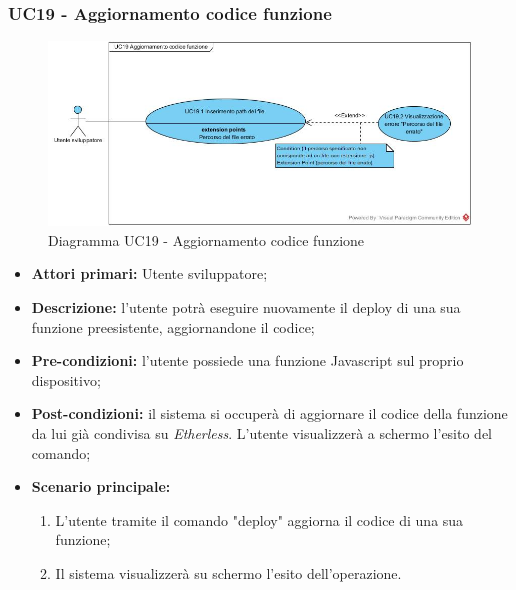 \subsubsection{UC19 - Aggiornamento codice funzione}
\begin{figure}[h]
	\centering
	\includegraphics[width=\linewidth]{res/img/UC19.jpg}
	\caption{Diagramma UC19 - Aggiornamento codice funzione}
\end{figure}
\begin{itemize}
	\item \textbf{Attori primari:} Utente sviluppatore;
	\item \textbf{Descrizione:} l'utente potrà eseguire nuovamente il deploy di una sua funzione preesistente, aggiornandone il codice; 
	\item \textbf{Pre-condizioni:} l'utente possiede una funzione Javascript sul proprio dispositivo;
	\item \textbf{Post-condizioni:} il sistema si occuperà di aggiornare il codice della funzione da lui già condivisa su \textit{Etherless}. L'utente visualizzerà a schermo l'esito del comando;
	\item \textbf{Scenario principale:} 
	\begin{enumerate}
		\item L'utente tramite il comando "deploy" aggiorna il codice di una sua funzione;
		\item Il sistema visualizzerà su schermo l'esito dell'operazione.
	\end{enumerate}
\end{itemize}